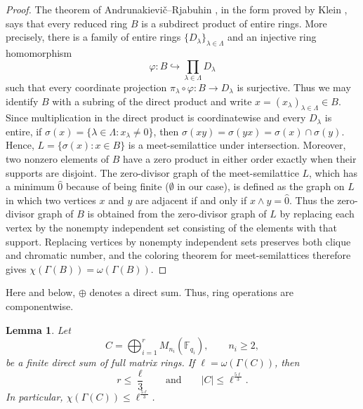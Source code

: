 \documentclass[a4paper,11pt]{amsart}
\newtheorem{lem}[lem]{Lemma}
\theoremstyle{definition}
\begin{document}
\begin{proof}
The theorem of Andrunakievi\v{c}--Rjabuhin
\cite{AndrunakievicRjabuhin68}, in the form proved by Klein \cite{Klein80}, says that every reduced ring $B$ is
a subdirect product of entire rings. More precisely, there is a family
of entire rings $\{D_\lambda\}_{\lambda\in\Lambda}$ and an injective ring
homomorphism
\[
    \varphi:B\hookrightarrow\prod_{\lambda\in\Lambda}D_\lambda
\]
such that every coordinate projection
$\pi_\lambda\circ\varphi:B\to D_\lambda$ is surjective. Thus we may identify
$B$ with a subring of the direct product and write
$x=(x_\lambda)_{\lambda\in\Lambda}\in B$. Since multiplication in the direct
product is coordinatewise and every $D_\lambda$ is entire, if
$\sigma(x)=\{\lambda\in\Lambda:x_\lambda\ne0\}$, then
$\sigma(xy)=\sigma(yx)=\sigma(x)\cap\sigma(y)$.
Hence, $L=\{\sigma(x):x\in B\}$ is a
meet-semilattice under intersection. Moreover, two nonzero elements of $B$
have a zero product in either order exactly when their supports are disjoint. The zero-divisor graph of the meet-semilattice $L$, which has a minimum $\hat{0}$ because of being finite ($\emptyset$ in our case), is defined as the graph on $L$ in which two vertices $x$ and $y$ are adjacent if and only if $x\wedge y=\hat{0}$.
Thus the zero-divisor graph of $B$ is obtained from the zero-divisor graph
of $L$ by replacing each vertex by the nonempty independent set consisting
of the elements with that support. Replacing vertices by nonempty
independent sets preserves both clique and chromatic number, and the coloring
theorem for meet-semilattices \cite[Theorem 1]{NWD07} therefore gives
$\chi(\Gamma(B))=\omega(\Gamma(B))$.
\end{proof}


Here and below, $\oplus$ denotes a
direct sum. Thus, ring operations are componentwise.

\begin{lem}\label{lem:matrix-sum}
Let
\[
    C=\bigoplus_{i=1}^r M_{n_i}(\mathbb F_{q_i}),
    \qquad n_i\ge2,
\]
be a finite direct sum of full matrix rings. If
$\ell=\omega(\Gamma(C))$, then
\[
    r\le\frac{\ell}{3}
    \qquad\text{and}\qquad
    |C|\le\ell^{\frac{5\ell}{3}}.
\]
In particular, $\chi(\Gamma(C))\le\ell^{\frac{5\ell}{3}}$.
\end{lem}
\end{document}
